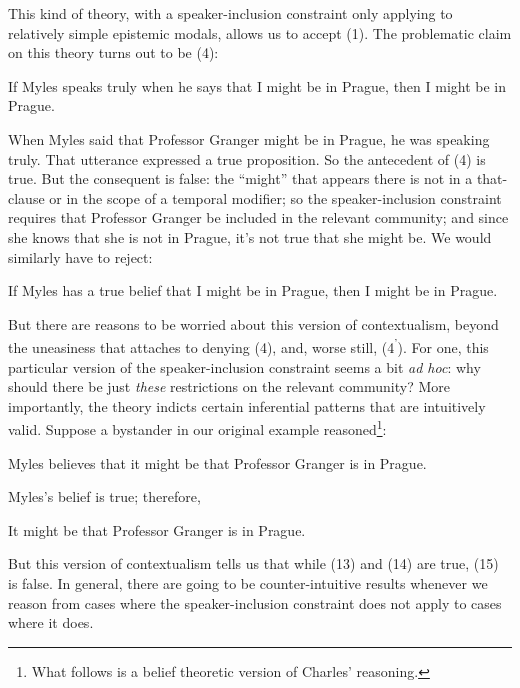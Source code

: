 \documentclass[
  10pt,
  letterpaper,
  DIV=11,
  numbers=noendperiod,
  twoside]{scrartcl}
\providecommand{\tightlist}{%
  \setlength{\itemsep}{0pt}\setlength{\parskip}{0pt}}\usepackage{longtable,booktabs,array}
\begin{document}
This kind of theory, with a speaker-inclusion constraint only applying
to relatively simple epistemic modals, allows us to accept (1). The
problematic claim on this theory turns out to be (4):

\begin{description}
\tightlist
\item[(4)]
If Myles speaks truly when he says that I might be in Prague, then I
might be in Prague.
\end{description}

When Myles said that Professor Granger might be in Prague, he was
speaking truly. That utterance expressed a true proposition. So the
antecedent of (4) is true. But the consequent is false: the ``might''
that appears there is not in a that-clause or in the scope of a temporal
modifier; so the speaker-inclusion constraint requires that Professor
Granger be included in the relevant community; and since she knows that
she is not in Prague, it's not true that she might be. We would
similarly have to reject:

\begin{description}
\tightlist
\item[(4\textsuperscript{'})]
If Myles has a true belief that I might be in Prague, then I might be in
Prague.
\end{description}

But there are reasons to be worried about this version of contextualism,
beyond the uneasiness that attaches to denying (4), and, worse still,
(4\textsuperscript{'}). For one, this particular version of the
speaker-inclusion constraint seems a bit \emph{ad hoc}: why should there
be just \emph{these} restrictions on the relevant community? More
importantly, the theory indicts certain inferential patterns that are
intuitively valid. Suppose a bystander in our original example
reasoned\footnote{What follows is a belief theoretic version of Charles'
  reasoning.}:

\begin{description}
\tightlist
\item[(13)]
Myles believes that it might be that Professor Granger is in Prague.
\item[(14)]
Myles's belief is true; therefore,
\item[(15)]
It might be that Professor Granger is in Prague.
\end{description}

But this version of contextualism tells us that while (13) and (14) are
true, (15) is false. In general, there are going to be counter-intuitive
results whenever we reason from cases where the speaker-inclusion
constraint does not apply to cases where it does.
\end{document}
